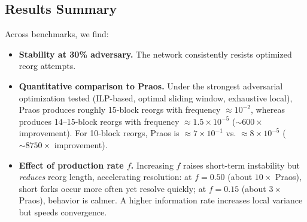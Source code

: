 \subsection{Results Summary}
Across benchmarks, we find:
\begin{itemize}
\item \textbf{Stability at 30\% adversary.} The network consistently resists optimized reorg attempts.%
\item \textbf{Quantitative comparison to Praos.} Under the strongest adversarial optimization tested (ILP-based, optimal sliding window, exhaustive local), Praos produces roughly 15-block reorgs with frequency $\approx 10^{-2}$, whereas \ProjBase{} produces 14--15-block reorgs with frequency $\approx 1.5\times 10^{-5}$ ($\sim 600\times$ improvement). For 10-block reorgs, Praos is $\approx 7\times 10^{-1}$ vs. \ProjBase{} $\approx 8\times 10^{-5}$ ($\sim 8750\times$ improvement).
\item \textbf{Effect of production rate $f$.} Increasing $f$ raises short-term instability but \emph{reduces} reorg length, accelerating resolution: at $f=0.50$ (about $10\times$ Praos), short forks occur more often yet resolve quickly; at $f=0.15$ (about $3\times$ Praos), behavior is calmer. A higher information rate increases local variance but speeds convergence.
\end{itemize}
